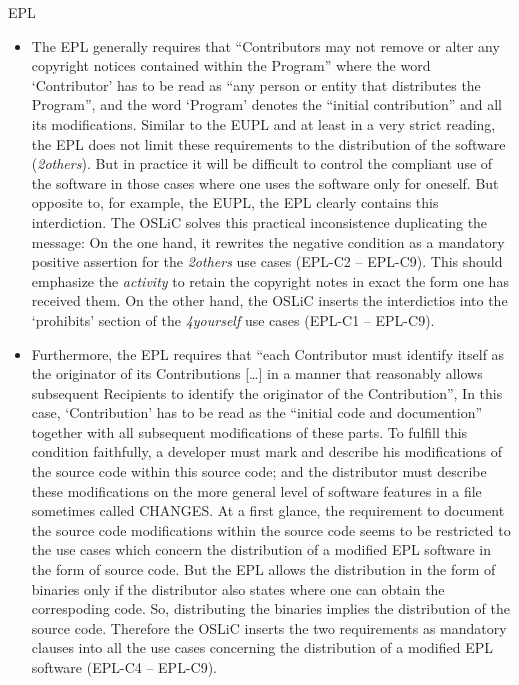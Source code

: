 \begin{license}{EPL}
\begin{itemize}
  \item The EPL generally requires that \enquote{Contributors may not remove or
    alter any copyright notices contained within the Program} where
    the word `Contributor' has to be read as \enquote{any person or entity that
    distributes the Program}, and the word `Program' denotes the
    \enquote{initial contribution} and all its modifications. 
    Similar to the EUPL and at least in a very strict reading, the EPL does not
    limit these requirements to the distribution of the software
    (\emph{2others}). But in practice it will be difficult to control the
    compliant use of the software in those cases where one uses the software
    only for oneself. But opposite to, for example, the EUPL, the EPL clearly
    contains this interdiction. The OSLiC solves this practical inconsistence
    duplicating the message: On the one hand, it rewrites the negative condition
    as a mandatory positive assertion for the \emph{2others} use cases (EPL-C2 --
    EPL-C9). This should emphasize the \emph{activity} to retain the copyright
    notes in exact the form one has received them. On the other hand, the OSLiC
    inserts the interdictios into the `prohibits' section of the
    \emph{4yourself} use cases (EPL-C1 -- EPL-C9).
  
  \item Furthermore, the EPL requires that \enquote{each Contributor must
    identify itself as the originator of its Contributions [\ldots] in a manner
    that reasonably allows subsequent Recipients to identify the originator of
    the Contribution}, In this case, `Contribution' has to be read
    as the \enquote{initial code and documention} together with all subsequent
    modifications of these parts. To fulfill this condition
    faithfully, a developer must mark and describe his modifications of the
    source code within this source code; and the distributor must describe these
    modifications on the more general level of software features in a file
    sometimes called CHANGES. At a first glance, the requirement to document the
    source code modifications within the source code seems to be restricted to
    the use cases which concern the distribution of a modified EPL software in
    the form of source code. But the EPL allows the distribution in the form of
    binaries only if the distributor also states where one can obtain the
    correspoding code. So, distributing the binaries implies the
    distribution of the source code.  Therefore the OSLiC inserts the two
    requirements as mandatory clauses into all the use cases concerning the
    distribution of a modified EPL software (EPL-C4 -- EPL-C9).
  

\end{itemize}
\end{license}
